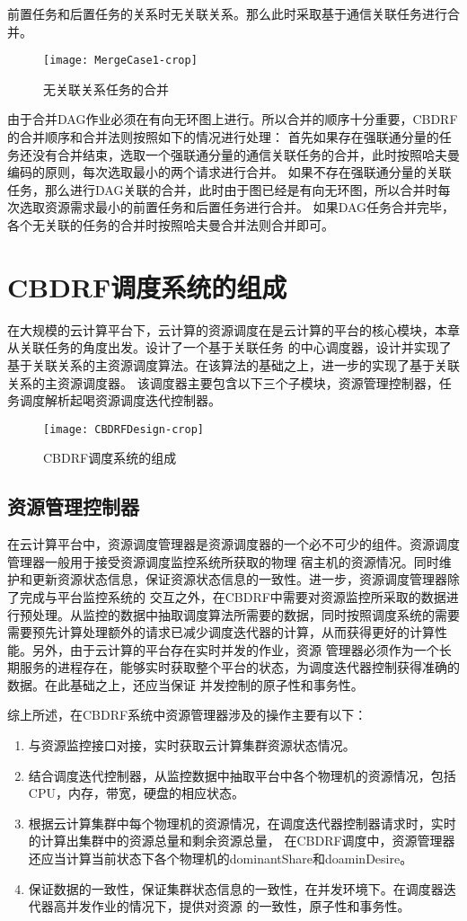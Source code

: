 前置任务和后置任务的关系时无关联关系。那么此时采取基于通信关联任务进行合并。
\begin{figure}[htbp]
\centering\texttt{[image: MergeCase1-crop]}
\caption{无关联关系任务的合并}\label{fig:MergeCase1}
\end{figure}

由于合并DAG作业必须在有向无环图上进行。所以合并的顺序十分重要，CBDRF的合并顺序和合并法则按照如下的情况进行处理：
首先如果存在强联通分量的任务还没有合并结束，选取一个强联通分量的通信关联任务的合并，此时按照哈夫曼编码的原则，每次选取最小的两个请求进行合并。
如果不存在强联通分量的关联任务，那么进行DAG关联的合并，此时由于图已经是有向无环图，所以合并时每次选取资源需求最小的前置任务和后置任务进行合并。
如果DAG任务合并完毕，各个无关联的任务的合并时按照哈夫曼合并法则合并即可。

\section{CBDRF调度系统的组成}
在大规模的云计算平台下，云计算的资源调度在是云计算的平台的核心模块，本章从关联任务的角度出发。设计了一个基于关联任务
的中心调度器，设计并实现了基于关联关系的主资源调度算法。在该算法的基础之上，进一步的实现了基于关联关系的主资源调度器。
该调度器主要包含以下三个子模块，资源管理控制器，任务调度解析起喝资源调度迭代控制器。
\begin{figure}[htbp]
\centering\texttt{[image: CBDRFDesign-crop]}
\caption{CBDRF调度系统的组成}\label{fig:CBDRFDesign}
\end{figure}
\subsection{资源管理控制器}
在云计算平台中，资源调度管理器是资源调度器的一个必不可少的组件。资源调度管理器一般用于接受资源调度监控系统所获取的物理
宿主机的资源情况。同时维护和更新资源状态信息，保证资源状态信息的一致性。进一步，资源调度管理器除了完成与平台监控系统的
交互之外，在CBDRF中需要对资源监控所采取的数据进行预处理。从监控的数据中抽取调度算法所需要的数据，同时按照调度系统的需要
需要预先计算处理额外的请求已减少调度迭代器的计算，从而获得更好的计算性能。另外，由于云计算的平台存在实时并发的作业，资源
管理器必须作为一个长期服务的进程存在，能够实时获取整个平台的状态，为调度迭代器控制获得准确的数据。在此基础之上，还应当保证
并发控制的原子性和事务性。

综上所述，在CBDRF系统中资源管理器涉及的操作主要有以下：
\begin{enumerate}
\item 与资源监控接口对接，实时获取云计算集群资源状态情况。
\item 结合调度迭代控制器，从监控数据中抽取平台中各个物理机的资源情况，包括CPU，内存，带宽，硬盘的相应状态。
\item 根据云计算集群中每个物理机的资源情况，在调度迭代器控制器请求时，实时的计算出集群中的资源总量和剩余资源总量，
在CBDRF调度中，资源管理器还应当计算当前状态下各个物理机的dominantShare和doaminDesire。
\item 保证数据的一致性，保证集群状态信息的一致性，在并发环境下。在调度器迭代器高并发作业的情况下，提供对资源
的一致性，原子性和事务性。
\end{enumerate}

